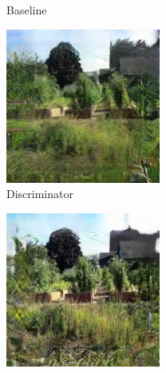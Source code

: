 \documentclass{article}
\begin{document}
\begin{figure}
\begin{subfigure}[b]{0.175\textwidth}
        \caption{Baseline}
    \end{subfigure}
    \hfill
    \begin{subfigure}[b]{0.175\textwidth}
        \includegraphics[width=\textwidth]{figs/fig2/local}
        \caption{Discriminator}
    \end{subfigure}
    \hfill
    \begin{subfigure}[b]{0.175\textwidth}
        \includegraphics[width=\textwidth]{figs/fig2/residual}

\end{subfigure}
\end{figure}
\end{document}
